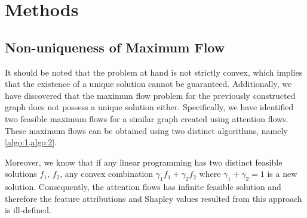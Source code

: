 \documentclass{article} %
\theoremstyle{bfnote}
\newtheorem{theorem}{Theorem}[section]
\newtheorem{definition}[theorem]{Definition}
\newtheorem{observation}[theorem]{Observation}
\begin{document}
\section{Methods}

\subsection{Non-uniqueness of Maximum Flow}
%
%
%

It should be noted that the problem at hand is not strictly convex, which implies that the existence of a unique solution cannot be guaranteed. Additionally, we have discovered that the maximum flow problem for the previously constructed graph does not possess a unique solution either. Specifically, we have identified two feasible maximum flows for a similar graph created using attention flows. These maximum flows can be obtained using two distinct algorithms, namely \cref{algo:1,algo:2}.


Moreover, we know that if any linear programming has two distinct feasible solutions $f_1$, $f_2$, any convex combination $\gamma_1 f_1 + \gamma_2 f_2$ where $\gamma_1+\gamma_2=1$ is a new solution. Consequently, the attention flows has infinite feasible solution and therefore the feature attributions and Shapley values resulted from this approach is ill-defined.  


\end{document}
